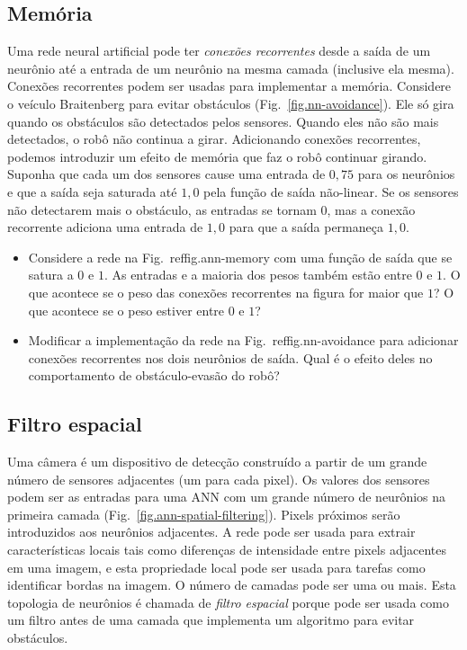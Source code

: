 \subsection{Memória}\label{s.ann-memory}

Uma rede neural artificial pode ter \emph{conexões recorrentes} desde a saída de um neurônio até a entrada de um neurônio na mesma camada (inclusive ela mesma). Conexões recorrentes podem ser usadas para implementar a memória. Considere o veículo Braitenberg para evitar obstáculos (Fig.~\ref{fig.nn-avoidance}). Ele só gira quando os obstáculos são detectados pelos sensores. Quando eles não são mais detectados, o robô não continua a girar. Adicionando conexões recorrentes, podemos introduzir um efeito de memória que faz o robô continuar girando. Suponha que cada um dos sensores cause uma entrada de $0,75$ para os neurônios e que a saída seja saturada até $1,0$ pela função de saída não-linear. Se os sensores não detectarem mais o obstáculo, as entradas se tornam $0$, mas a conexão recorrente adiciona uma entrada de $1,0$ para que a saída permaneça $1,0$.

\begin{framed}
\begin{itemize}
\item Considere a rede na Fig.~ref{fig.ann-memory} com uma função de saída que se satura a $0$ e $1$. As entradas e a maioria dos pesos também estão entre $0$ e $1$. O que acontece se o peso das conexões recorrentes na figura for maior que $1$? O que acontece se o peso estiver entre $0$ e $1$?
\item Modificar a implementação da rede na Fig.~ref{fig.nn-avoidance} para adicionar conexões recorrentes nos dois neurônios de saída. Qual é o efeito deles no comportamento de obstáculo-evasão do robô?
\end{itemize}
\end{framed}

\subsection{Filtro espacial}

Uma câmera é um dispositivo de detecção construído a partir de um grande número de sensores adjacentes (um para cada pixel). Os valores dos sensores podem ser as entradas para uma ANN com um grande número de neurônios na primeira camada (Fig.~\ref{fig.ann-spatial-filtering}). Pixels próximos serão introduzidos aos neurônios adjacentes. A rede pode ser usada para extrair características locais tais como diferenças de intensidade entre pixels adjacentes em uma imagem, e esta propriedade local pode ser usada para tarefas como identificar bordas na imagem. O número de camadas pode ser uma ou mais. Esta topologia de neurônios é chamada de \emph{filtro espacial} porque pode ser usada como um filtro antes de uma camada que implementa um algoritmo para evitar obstáculos.

